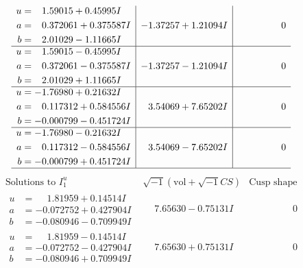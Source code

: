 \documentclass[1p]{elsarticle_modified}
\theoremstyle{definition}
\newcommand{\I}{\sqrt{-1}}
\begin{document}
$$\begin{array}{c|c|c}
\begin{aligned}
u &= \phantom{-}1.59015 + 0.45995 I \\
a &= \phantom{-}0.372061 + 0.375587 I \\
b &= \phantom{-}2.01029 - 1.11665 I\end{aligned}
 & -1.37257 + 1.21094 I & \phantom{-0.000000 } 0 \\ \hline\begin{aligned}
u &= \phantom{-}1.59015 - 0.45995 I \\
a &= \phantom{-}0.372061 - 0.375587 I \\
b &= \phantom{-}2.01029 + 1.11665 I\end{aligned}
 & -1.37257 - 1.21094 I & \phantom{-0.000000 } 0 \\ \hline\begin{aligned}
u &= -1.76980 + 0.21632 I \\
a &= \phantom{-}0.117312 + 0.584556 I \\
b &= -0.000799 - 0.451724 I\end{aligned}
 & \phantom{-}3.54069 + 7.65202 I & \phantom{-0.000000 } 0 \\ \hline\begin{aligned}
u &= -1.76980 - 0.21632 I \\
a &= \phantom{-}0.117312 - 0.584556 I \\
b &= -0.000799 + 0.451724 I\end{aligned}
 & \phantom{-}3.54069 - 7.65202 I & \phantom{-0.000000 } 0\\
 \hline 
 \end{array}$$\newpage$$\begin{array}{c|c|c}  
\text{Solutions to }I^u_{1}& \I (\text{vol} + \sqrt{-1}CS) & \text{Cusp shape}\\
 \hline 
\begin{aligned}
u &= \phantom{-}1.81959 + 0.14514 I \\
a &= -0.072752 + 0.427904 I \\
b &= -0.080946 - 0.709949 I\end{aligned}
 & \phantom{-}7.65630 - 0.75131 I & \phantom{-0.000000 } 0 \\ \hline\begin{aligned}
u &= \phantom{-}1.81959 - 0.14514 I \\
a &= -0.072752 - 0.427904 I \\
b &= -0.080946 + 0.709949 I\end{aligned}
 & \phantom{-}7.65630 + 0.75131 I & \phantom{-0.000000 } 0 \\ \hline\begin{aligned}

\end{aligned}
\end{array}$$
\end{document}
